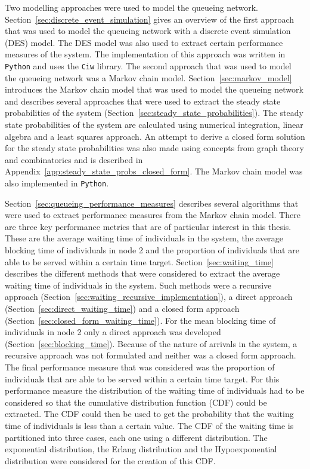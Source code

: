 Two modelling approaches were used to model the queueing network.
Section~\ref{sec:discrete_event_simulation} gives an overview of the first
approach that was used to model the queueing network with a discrete event
simulation (DES) model.
The DES model was also used to extract certain performance measures of the
system.
The implementation of this approach was written in \texttt{Python} and uses the
\texttt{Ciw} library.
The second approach that was used to model the queueing network
was a Markov chain model.
Section~\ref{sec:markov_model} introduces the Markov chain model that was
used to model the queueing network and describes several approaches that
were used to extract the steady state probabilities of the system
(Section~\ref{sec:steady_state_probabilities}).
The steady state probabilities of the system are calculated using numerical
integration, linear algebra and a least squares approach.
An attempt to derive a closed form solution for the steady state
probabilities was also made using concepts from graph theory and
combinatorics and is described in
Appendix~\ref{app:steady_state_probs_closed_form}.
The Markov chain model was also implemented in \texttt{Python}.

Section~\ref{sec:queueing_performance_measures} describes several algorithms
that were used to extract performance measures from the Markov chain model.
There are three key performance metrics that are of particular interest in this
thesis.
These are the average waiting time of individuals in the system, the average
blocking time of individuals in node 2 and the proportion of individuals that
are able to be served within a certain time target.
Section~\ref{sec:waiting_time} describes the different methods that were
considered to extract the average waiting time of individuals in the system.
Such methods were a recursive approach
(Section~\ref{sec:waiting_recursive_implementation}), a direct approach 
(Section~\ref{sec:direct_waiting_time}) and a closed form approach
(Section~\ref{sec:closed_form_waiting_time}).
For the mean blocking time of individuals in node 2 only a direct approach
was developed (Section~\ref{sec:blocking_time}).
Because of the nature of arrivals in the system, a recursive approach was not
formulated and neither was a closed form approach.
The final performance measure that was considered was the proportion of
individuals that are able to be served within a certain time target.
For this performance measure the distribution of the waiting time of
individuals had to be considered so that the cumulative distribution
function (CDF) could be extracted.
The CDF could then be used to get the probability that the waiting time of
individuals is less than a certain value.
The CDF of the waiting time is partitioned into three cases, each one using a
different distribution.
The exponential distribution, the Erlang distribution and the Hypoexponential
distribution were considered for the creation of this CDF.

